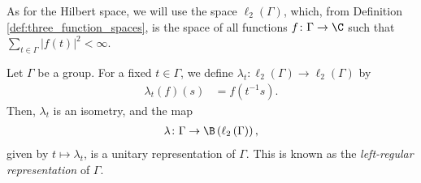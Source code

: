 As for the Hilbert space, we will use the space $\ell_2\left( \Gamma \right)$, which, from Definition \ref{def:three_function_spaces}, is the space of all functions $f\colon \Gamma\rightarrow \C$ such that $\sum_{t\in \Gamma}\left\vert f(t) \right\vert^2 < \infty$.
\begin{theorem}\label{thm:left_regular_representation}
  Let $\Gamma$ be a group. For a fixed $t\in\Gamma$, we define $\lambda_t\colon \ell_2\left( \Gamma \right)\rightarrow \ell_2\left( \Gamma \right)$ by
  \begin{align*}
    \lambda_t\left( f \right)\left( s \right) &= f\left( t^{-1}s \right).
  \end{align*}
  Then, $\lambda_t$ is an isometry, and the map
  \begin{align*}
    \lambda\colon \Gamma\rightarrow \B\left( \ell_2\left( \Gamma \right) \right),
  \end{align*}
  given by $t\mapsto \lambda_t$, is a unitary representation of $\Gamma$. This is known as the \textit{left-regular representation} of $\Gamma$.
\end{theorem}
